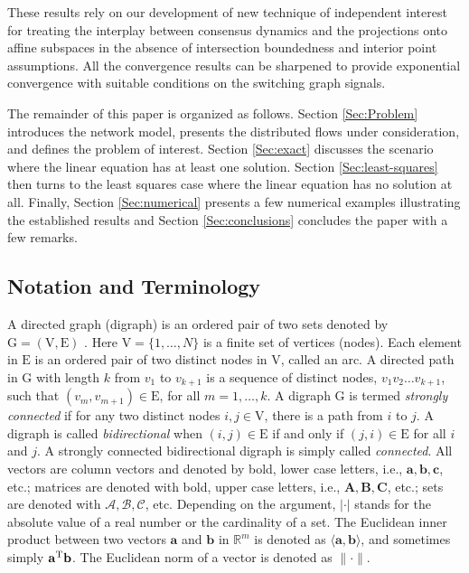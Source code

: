 \documentclass[a4paper, 11pt]{article}
\def\T{^{\rm\tiny T}}
\begin{document}
These results rely on our development of new technique of independent interest for treating the interplay between consensus dynamics and the projections onto affine subspaces in the absence of  intersection boundedness and interior point assumptions. All the convergence results  can be sharpened to provide exponential convergence with suitable conditions on the switching graph signals.

The remainder of this paper is organized as follows. Section \ref{Sec:Problem} introduces the network model, presents the distributed flows under consideration, and defines the problem of interest. Section \ref{Sec:exact} discusses the scenario where the linear equation has at least one solution. Section \ref{Sec:least-squares} then turns to the least squares case where the linear equation has no solution at all. Finally, Section \ref{Sec:numerical} presents a few numerical examples illustrating the established  results and Section \ref{Sec:conclusions} concludes the paper with a few remarks.


\subsection*{Notation and Terminology}

A directed graph (digraph) is an ordered pair of two sets denoted by $\mathrm {G} =(\mathrm{V}, \mathrm{E} )$ \cite{god}. Here $\mathrm{V}=\{1,\dots,N\}$  is a finite set of  vertices (nodes). Each element in $\mathrm{E}$ is an ordered pair of two distinct  nodes in $\mathrm {V}$, called an arc.  A  directed path in $\mathrm {G}$ with length $k$ from $v_1$ to $v_{k+1}$ is a  sequence of distinct nodes, $v_1v_2\dots v_{k+1}$, such that  $(v_m, v_{m+1}) \in \mathrm{E}$, for all $m=1,\dots,k$. A digraph $\mathrm{G}$ is termed {\it strongly connected} if for any two distinct nodes $i,j\in\mathrm{V}$, there is a  path from $i$ to $j$. A digraph is called {\it bidirectional} when $(i,j)\in\mathrm{E}$ if and only if $(j,i)\in\mathrm{E}$ for all $i$ and $j$. A strongly connected bidirectional digraph  is  simply called {\it connected}. All vectors are column vectors and denoted by bold, lower case letters, i.e., $\mathbf{a},\mathbf{b},\mathbf{c}$,  etc.; matrices are denoted with bold, upper case letters, i.e.,  $\mathbf{A},\mathbf{B},\mathbf{C}$,  etc.;  sets are denoted with $\mathcal{A},\mathcal{B},\mathcal{C}$, etc. Depending on the argument, $|\cdot|$ stands for the absolute value of a real number or the cardinality of a set.  The Euclidean inner product between two vectors $\mathbf{a}$ and $\mathbf{b}$ in $\mathbb{R}^m$ is denoted as $\langle \mathbf{a}, \mathbf{b}\rangle$, and sometimes  simply  $\mathbf{a}\T \mathbf{b}$.  The Euclidean norm of a vector is denoted as $\|\cdot\|$.
\end{document}
